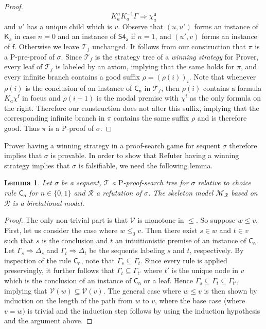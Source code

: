 \documentclass{myifcolog}
\newcommand{\K}{K}
\newcommand{\agi}{a}
\newcommand{\fw}{\mathcal{M}}
\newcommand{\f}{\mathsf{f}}
\renewcommand{\u}{\mathsf{u}}
\newcommand{\V}{\mathcal{V}}
\newcommand{\hickp}{\mathrm{P}}
\newtheorem{lemma}[theorem]{Lemma}
\numberwithin{theorem}{section}
\begin{document}
\begin{proof}
\begin{equation*}
          \K_\agi^n \K_\agi^{-1}\Gamma \Rightarrow \chi_\agi^\u
     \end{equation*}
     and $u'$ has a unique child which is $v$. Observe that $(u,u')$ forms an instance of $\mathsf{\K_\agi}$ in case $n=0$ and an instance of $\mathsf{S4_\agi}$ if $n=1$, and $(u', v)$ forms an instance of $\mathsf{f}$. Otherwise we leave $\mathcal{T}_f$ unchanged. It follows from our construction that  $\pi$ is a $\hickp$-pre-proof of $\sigma$. Since $\mathcal{T}_f$ is the strategy tree of a \emph{winning strategy} for Prover, every leaf of $\mathcal{T}_f$ is labeled by an axiom, implying that the same holds for $\pi$, and every infinite branch contains a good suffix $\rho = (\rho(i))_i$. Note that whenever $\rho(i)$ is the conclusion of an instance of $\mathsf{C_n}$ in $\mathcal{T}_f$, then $\rho(i)$ contains a formula $\K_\agi \chi^\f$ in focus and $\rho(i+1)$ is the modal premise with $\chi^\f$ as the only formula on the right. Therefore our construction does not alter this suffix, implying that the corresponding infinite branch in $\pi$ contains the same suffix $\rho$ and is therefore good. Thus $\pi$ is a $\hickp$-proof of $\sigma$.
 \end{proof}

Prover having a winning strategy in a proof-search game for sequent $\sigma$ therefore implies that $\sigma$ is provable. In order to show that Refuter having a winning strategy implies that $\sigma$ is falsifiable, we need the following lemma.

\begin{lemma}\label{l: skeleton model is birelation}
    Let $\sigma$ be a sequent, $\mathcal{T}$ a $\hickp$-proof-search tree for $\sigma$ relative to choice rule $\mathsf{C_n}$ for $n \in \{0,1\}$ and $\mathscr{R}$ a refutation of $\sigma$. The skeleton model $\fw_\mathscr{R}$ based on $\mathscr{R}$ is a birelational model.
\end{lemma}
\begin{proof}
    The only non-trivial part is that $\V$ is monotone in $\leq$. So suppose $w \leq v$. First, let us consider the case where $w \leq_0 v$. Then there exist $s \in w$ and $t \in v$ such that $s$ is the conclusion and $t$ an intuitionistic premise of an instance of $\mathsf{C_n}$. Let $\Gamma_s \Rightarrow \Delta_s$ and $\Gamma_t \Rightarrow \Delta_t$ be the sequents labeling $s$ and $t$, respectively. By inspection of the rule $\mathsf{C_n}$, note that $\Gamma_s \subseteq \Gamma_t$. Since every rule is applied preservingly, it further follows that $\Gamma_t \subseteq \Gamma_{t'}$ where $t'$ is the unique node in $v$ which is the conclusion of an instance of $\mathsf{C_n}$ or a leaf. Hence $\Gamma_s \subseteq \Gamma_t \subseteq \Gamma_{t'}$, implying that $\V(w) \subseteq \V(v)$. The general case where $w \leq v$ is then shown by induction on the length of the path from $w$ to $v$, where the base case (where $v = w)$ is trivial and the induction step follows by using the induction hypothesis and the argument above.
\end{proof}
\end{document}
